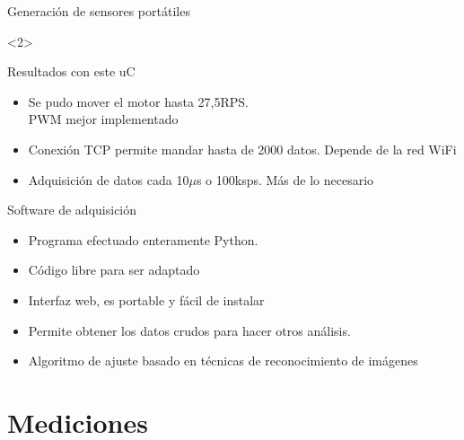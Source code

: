 \begin{frame}{Generación de sensores portátiles}
\begin{onlyenv}<2>
    \begin{block}{Resultados con este uC}
        \begin{itemize}
            \item Se pudo mover el motor hasta 27,5RPS. \\PWM mejor implementado
            \item Conexión TCP permite mandar hasta de 2000 datos. Depende de la red WiFi
            \item Adquisición de datos cada 10$\mu$s o 100ksps. Más de lo necesario
        \end{itemize}
    \end{block}
\end{onlyenv}

\end{frame}

\begin{frame}{Software de adquisición}

\begin{itemize}
\item Programa efectuado enteramente Python.
\item Código libre para ser adaptado
\item Interfaz web, es portable y fácil de instalar
\item Permite obtener los datos crudos para hacer otros análisis.
\item Algoritmo de ajuste basado en técnicas de reconocimiento de imágenes
\end{itemize}



\end{frame}

\section{Mediciones}


